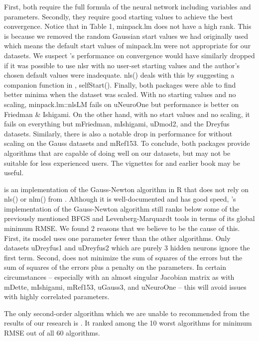 First, both require the full formula of the neural network including
variables and parameters. Secondly, they require good starting values to
achieve the best convergence. Notice that in Table 1, minpack.lm does
not have a high rank. This is because we removed the random Gaussian
start values we had originally used which means the default start values
of minpack.lm were not appropriate for our datasets. We suspect
's performance on convergence would have similarly dropped
if it was possible to use nlsr with no user-set starting values and the
author's chosen default values were inadequate. nls() deals with this by
suggesting a companion function in , selfStart().
Finally, both packages were able to find better minima when the dataset
was scaled. With no starting values and no scaling, minpack.lm::nlsLM
fails on uNeuroOne but performance is better on Friedman \& Ishigami. On
the other hand, with no start values and no scaling, it fails on
everything but mFriedman, mIshigami, uDmod2, and the Dreyfus datasets.
Similarly, there is also a notable drop in performance for
 without scaling on the Gauss datasets and mRef153. To
conclude, both packages provide algorithms that are capable of doing
well on our datasets, but may not be suitable for less experienced
users. The vignettes for  and earlier book
\citep{Nash-nlpor14} may be useful.

 \citep{R-brnn} is an implementation of the Gauss-Newton
algorithm in R that does not rely on nls() or nlm() from
. Although it is well-documented and has good speed,
's implementation of the Gauss-Newton algorithm still
ranks below some of the previously mentioned BFGS and
Levenberg-Marquardt tools in terms of its global minimum RMSE. We found
2 reasons that we believe to be the cause of this. First, its model uses
one parameter fewer than the other algorithms. Only datasets uDreyfus1
and uDreyfus2 which are purely 3 hidden neurons ignore the first term.
Second,  does not minimize the sum of squares of the
errors but the sum of squares of the errors plus a penalty on the
parameters. In certain circumstances -- especially with an almost
singular Jacobian matrix as with mDette, mIshigami, mRef153, uGauss3,
and uNeuroOne -- this will avoid issues with highly correlated
parameters.

The only second-order algorithm which we are unable to recommended from
the results of our research is  \citep{R-snnR}. It ranked
among the 10 worst algorithms for minimum RMSE out of all 60 algorithms.

